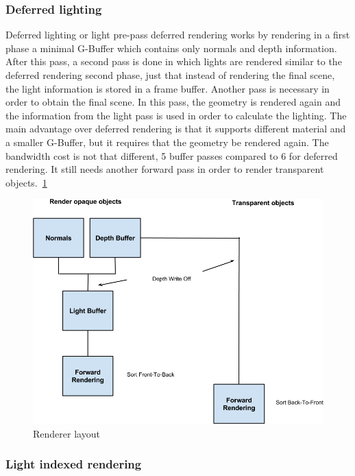 \subsubsection{Deferred lighting}

Deferred lighting or light pre-pass deferred rendering works by rendering in a first phase a minimal G-Buffer which contains only normals and depth information. After this pass, a second pass is done in which lights are rendered similar to the deferred rendering second phase, just that instead of rendering the final scene, the light information is stored in a frame buffer. 
Another pass is necessary in order to obtain the final scene. In this pass, the geometry is rendered again and the information from the light pass is used in order to calculate the lighting.
The main advantage over deferred rendering is that it supports different material and a smaller G-Buffer, but it requires that the geometry be rendered again. The bandwidth cost is not that different, 5 buffer passes compared to 6 for deferred rendering.
It still needs another forward pass in order to render transparent objects.~\ref{img:lightning1}

\begin{center}
	\begin{figure}[here]
		
		\includegraphics[scale=0.3]{src/img/lightning1.png}
		\caption{Renderer layout}
		\label{img:lightning1}
	\end{figure}
\end{center}

\subsubsection{Light indexed rendering}

